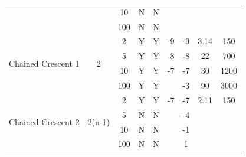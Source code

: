 \documentclass[10pt, oneside]{article}
\begin{document}
\begin{table}[]
\begin{tabular}{c|c|ccccccc}
                                                                                     &                           & 10  & N           & N                                                        &       &              &         &           \\  
                                                                                     &                           & 100 & N           & N                                                        &       &              &         &           \\ \hline
\multirow{4}{*}{Chained Crescent 1}                                                  & \multirow{4}{*}{2}        & 2   & Y           & Y                                                        & -9    & -9           & 3.14    & 150       \\  
                                                                                     &                           & 5   & Y           & Y                                                        & -8    & -8           & 22      & 700       \\  
                                                                                     &                           & 10  & Y           & Y                                                        & -7    & -7           & 30      & 1200      \\  
                                                                                     &                           & 100 & Y           & Y                                                        &       & -3           &   90      &    3000       \\ \hline
\multirow{4}{*}{Chained Crescent 2}                                                  & \multirow{4}{*}{2(n-1)}   & 2   & Y           & Y                                                        & -7    & -7           & 2.11    & 150       \\  
                                                                                     &                           & 5   & N           & N                                                        &       & -4           &         &           \\  
                                                                                     &                           & 10  & N           & N                                                        &       & -1           &         &           \\  
                                                                                     &                           & 100 & N           & N                                                        &       & 1            &         &           \\ \hline
\end{tabular}


\end{table}
\end{document}
